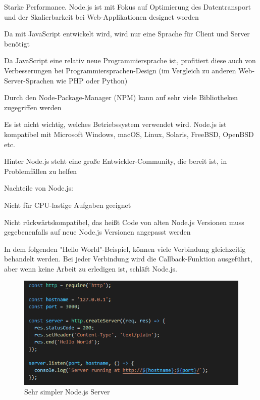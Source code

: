 \begin{compactitem}
    \item Starke Performance. Node.js ist mit Fokus auf Optimierung des Datentransport und der Skalierbarkeit bei Web-Applikationen designet worden
    \item Da mit JavaScript entwickelt wird, wird nur eine Sprache für Client und Server benötigt
    \item Da JavaScript eine relativ neue Programmiersprache ist, profitiert diese auch von Verbesserungen bei Programmiersprachen-Design (im Vergleich zu anderen Web-Server-Sprachen wie PHP oder Python)
    \item Durch den Node-Package-Manager (NPM) kann auf sehr viele Bibliotheken zugegriffen werden
    \item Es ist nicht wichtig, welches Betriebssystem verwendet wird. Node.js ist kompatibel mit Microsoft Windows, macOS, Linux, Solaris, FreeBSD, OpenBSD etc.
    \item Hinter Node.js steht eine große Entwickler-Community, die bereit ist, in Problemfällen zu helfen
\end{compactitem}

Nachteile von Node.js: \cite{nodejs_nachteile}

\begin{compactitem}
    \item Nicht für CPU-lastige Aufgaben geeignet
    \item Nicht rückwärtskompatibel, das heißt Code von alten Node.js Versionen muss gegebenenfalls auf neue Node.js Versionen angepasst werden
\end{compactitem}

In dem folgenden "Hello World"-Beispiel, können viele Verbindung gleichzeitig behandelt werden. Bei jeder Verbindung wird die Callback-Funktion ausgeführt, aber wenn keine Arbeit zu erledigen ist, schläft Node.js.

\begin{figure}[H]
    \centering
    \includegraphics[scale=1]{pics/node js.PNG}
    \caption{Sehr simpler Node.js Server}
\end{figure}

